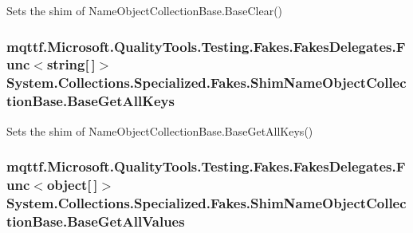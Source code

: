 Sets the shim of Name\-Object\-Collection\-Base.\-Base\-Clear()

\hypertarget{class_system_1_1_collections_1_1_specialized_1_1_fakes_1_1_shim_name_object_collection_base_a2d369cc6954fdb552a725d740a7a3f18}{
\subsubsection[{Base\-Get\-All\-Keys}]{\setlength{\rightskip}{0pt plus 5cm}mqttf.\-Microsoft.\-Quality\-Tools.\-Testing.\-Fakes.\-Fakes\-Delegates.\-Func$<$string\mbox{[}$\,$\mbox{]}$>$ System.\-Collections.\-Specialized.\-Fakes.\-Shim\-Name\-Object\-Collection\-Base.\-Base\-Get\-All\-Keys\hspace{0.3cm}{\ttfamily [set]}}}\label{class_system_1_1_collections_1_1_specialized_1_1_fakes_1_1_shim_name_object_collection_base_a2d369cc6954fdb552a725d740a7a3f18}


Sets the shim of Name\-Object\-Collection\-Base.\-Base\-Get\-All\-Keys()

\hypertarget{class_system_1_1_collections_1_1_specialized_1_1_fakes_1_1_shim_name_object_collection_base_a0a116cff160b42c06fc6e2b70d16a09b}{
\subsubsection[{Base\-Get\-All\-Values}]{\setlength{\rightskip}{0pt plus 5cm}mqttf.\-Microsoft.\-Quality\-Tools.\-Testing.\-Fakes.\-Fakes\-Delegates.\-Func$<$object\mbox{[}$\,$\mbox{]}$>$ System.\-Collections.\-Specialized.\-Fakes.\-Shim\-Name\-Object\-Collection\-Base.\-Base\-Get\-All\-Values\hspace{0.3cm}{\ttfamily [set]}}}\label{class_system_1_1_collections_1_1_specialized_1_1_fakes_1_1_shim_name_object_collection_base_a0a116cff160b42c06fc6e2b70d16a09b}



